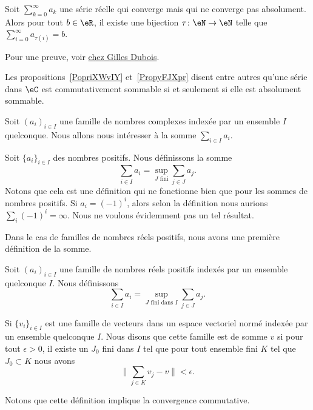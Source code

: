 \begin{proposition}     \label{PropyFJXpr}
    Soit \( \sum_{k=0}^{\infty}a_k\) une série réelle qui converge mais qui ne converge pas absolument. Alors pour tout \( b\in \eR\), il existe une bijection \( \tau\colon \eN\to \eN\) telle que \( \sum_{i=0}^{\infty}a_{\tau(i)}=b\).
\end{proposition}
Pour une preuve, voir \href{http://gilles.dubois10.free.fr/analyse_reelle/seriescomconv.html}{chez Gilles Dubois}.

Les propositions~\ref{PopriXWvIY} et~\ref{PropyFJXpr} disent entre autres qu'une série dans \( \eC\) est commutativement sommable si et seulement si elle est absolument sommable.

Soit \( (a_i)_{i\in I}\) une famille de nombres complexes indexée par un ensemble \( I\) quelconque. Nous allons nous intéresser à la somme \( \sum_{i\in I}a_i\).


Soit \( \{ a_i \}_{i\in I}\) des nombres positifs. Nous définissons la somme
\begin{equation}
    \sum_{i\in I}a_i=\sup_{ J\text{ fini}}\sum_{j\in J}a_j.
\end{equation}
Notons que cela est une définition qui ne fonctionne bien que pour les sommes de nombres positifs. Si \( a_i=(-1)^i\), alors selon la définition nous aurions \( \sum_i(-1)^i=\infty\). Nous ne voulons évidemment pas un tel résultat.

Dans le cas de familles de nombres réels positifs, nous avons une première définition de la somme.
\begin{definition}  \label{DefHYgkkA}
Soit \( (a_i)_{i\in I}\) une famille de nombres réels positifs indexés par un ensemble quelconque \( I\). Nous définissons
\begin{equation}
    \sum_{i\in I}a_i=\sup_{ J\text{ fini dans } I}\sum_{j\in J}a_j.
\end{equation}
\end{definition}

\begin{definition}  \label{DefIkoheE}
    Si \( \{ v_i \}_{i\in I}\) est une famille de vecteurs dans un espace vectoriel normé indexée par un ensemble quelconque \( I\). Nous disons que cette famille est  de somme \( v\) si pour tout \( \epsilon>0\), il existe un \( J_0\) fini dans \( I\) tel que pour tout ensemble fini \( K\) tel que \( J_0\subset K\) nous avons
    \begin{equation}
        \| \sum_{j\in K}v_j-v \|<\epsilon.
    \end{equation}
\end{definition}
Notons que cette définition implique la convergence commutative.

